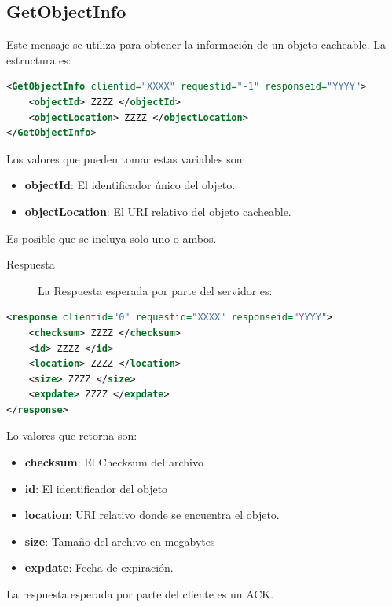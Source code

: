 \subsection{GetObjectInfo}
Este mensaje se utiliza para obtener la información de un objeto cacheable. La estructura es:

\begin{lstlisting}[language=XML,caption=Mensaje de GetObjectInfo]
<GetObjectInfo clientid="XXXX" requestid="-1" responseid="YYYY"> 
	<objectId> ZZZZ </objectId>
	<objectLocation> ZZZZ </objectLocation>
</GetObjectInfo>
\end{lstlisting}

Los valores que pueden tomar estas variables son:

\begin{itemize}
\item \textbf{objectId}: El identificador único del objeto.
\item \textbf{objectLocation}: El URI relativo del objeto cacheable.
\end{itemize}

Es posible que se incluya solo uno o ambos.

\begin{description}
\item[Respuesta] La Respuesta esperada por parte del servidor es:
\end{description}

\begin{lstlisting}[language=XML,caption=Mensaje de Respuesta de GetObjectInfo]
<response clientid="0" requestid="XXXX" responseid="YYYY"> 
	<checksum> ZZZZ </checksum>
	<id> ZZZZ </id>
	<location> ZZZZ </location>
	<size> ZZZZ </size>
	<expdate> ZZZZ </expdate>
</response>
\end{lstlisting}

Lo valores que retorna son:

\begin{itemize}
\item \textbf{checksum}:  El Checksum del archivo
\item \textbf{id}: El identificador del objeto
\item \textbf{location}: URI relativo donde se encuentra el objeto.
\item \textbf{size}: Tamaño del archivo en megabytes
\item \textbf{expdate}: Fecha de expiración.
\end{itemize}


La respuesta esperada por parte del cliente es un ACK.

